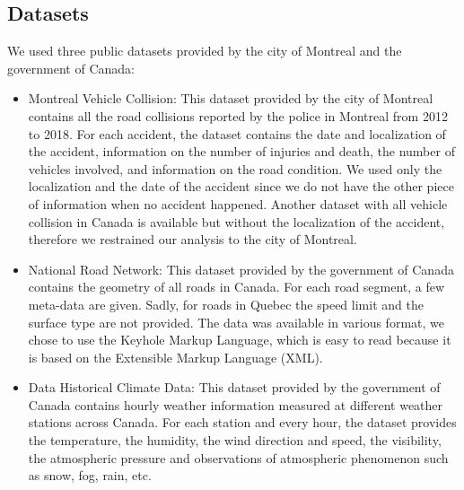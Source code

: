 \documentclass[conference]{IEEEtran}
\begin{document}
\subsection{Datasets}
We used three public datasets provided by the city of Montreal and the government of Canada: 
\begin{itemize}
\item Montreal Vehicle Collision: This dataset provided by the city of Montreal contains all the road collisions reported by the police in Montreal from 2012 to 2018. For each accident, the dataset contains the date and localization of the accident, information on the number of injuries and death, the number of vehicles involved, and information on the road condition. We used only the localization and the date of the accident since we do not have the other piece of information when no accident happened. Another dataset with all vehicle collision in Canada is available but without the localization of the accident, therefore we restrained our analysis to the city of Montreal.
\item National Road Network: This dataset provided by the government of Canada contains the geometry of all roads in Canada. For each road segment, a few meta-data are given. Sadly, for roads in Quebec the speed limit and the surface type are not provided. The data was available in various format, we chose to use the Keyhole Markup Language, which is easy to read because it is based on the Extensible Markup Language (XML). 
\item Data Historical Climate Data: This dataset provided by the government of Canada contains hourly weather information measured at different weather stations across Canada. For each station and every hour, the dataset provides the temperature, the humidity, the wind direction and speed, the visibility, the atmospheric pressure and observations of atmospheric phenomenon such as snow, fog, rain, etc.
\end{itemize}
\end{document}
